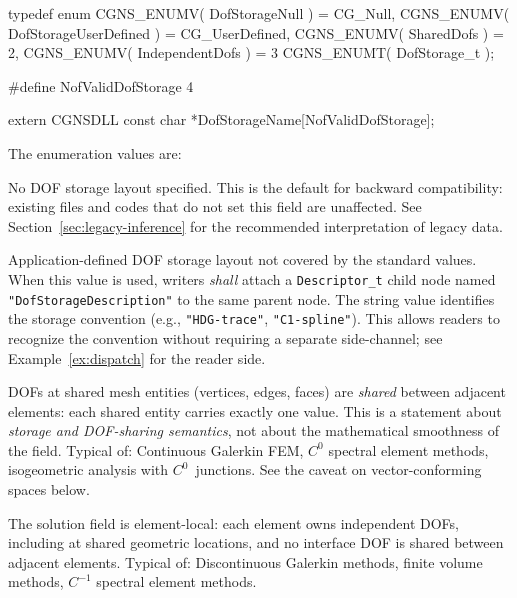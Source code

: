 \documentclass[11pt,letterpaper]{article}
\makeatletter
\let\cgns@orig@lstlisting\lstlisting
\let\cgns@endorig@lstlisting\endlstlisting
\renewenvironment{lstlisting}
  {\par\needspace{5\baselineskip}\nolinenumbers\cgns@orig@lstlisting}
  {\cgns@endorig@lstlisting\par\linenumbers}
\makeatother
\begin{document}
\begin{lstlisting}[language=C]
typedef enum {
  CGNS_ENUMV( DofStorageNull )        = CG_Null,
  CGNS_ENUMV( DofStorageUserDefined ) = CG_UserDefined,
  CGNS_ENUMV( SharedDofs )            = 2,
  CGNS_ENUMV( IndependentDofs )       = 3
} CGNS_ENUMT( DofStorage_t );

#define NofValidDofStorage 4

extern CGNSDLL const char *DofStorageName[NofValidDofStorage];
\end{lstlisting}

The enumeration values are:

\begin{description}[leftmargin=2em]
\item[\texttt{DofStorageNull}] No DOF storage layout specified.
  This is the default for backward compatibility: existing
  files and codes that do not set this field are unaffected.
  See Section~\ref{sec:legacy-inference} for the recommended
  interpretation of legacy data.

\item[\texttt{DofStorageUserDefined}] Application-defined DOF storage
  layout not covered by the standard values.  When this value is
  used, writers \emph{shall} attach a \texttt{Descriptor\_t} child
  node named \texttt{"DofStorageDescription"} to the same parent
  node.  The string value identifies
  the storage convention (e.g.,
  \texttt{"HDG-trace"}, \texttt{"C1-spline"}).  This allows readers
  to recognize the convention without requiring a separate
  side-channel; see Example~\ref{ex:dispatch} for the reader side.

\item[\texttt{SharedDofs}] DOFs at shared mesh entities
  (vertices, edges, faces) are \emph{shared} between adjacent
  elements: each shared entity carries exactly one value.  This is
  a statement about \emph{storage and DOF-sharing semantics}, not
  about the mathematical smoothness of the field.
  Typical of: Continuous Galerkin FEM,
  $C^0$ spectral element methods, isogeometric analysis with
  $C^0$~junctions.  See the caveat on vector-conforming spaces below.

\item[\texttt{IndependentDofs}] The solution field is
  element-local: each element owns independent DOFs, including at
  shared geometric locations, and no interface DOF is shared between
  adjacent elements.  Typical of: Discontinuous Galerkin methods,
  finite volume methods, $C^{-1}$ spectral element methods.
\end{description}
\end{document}
